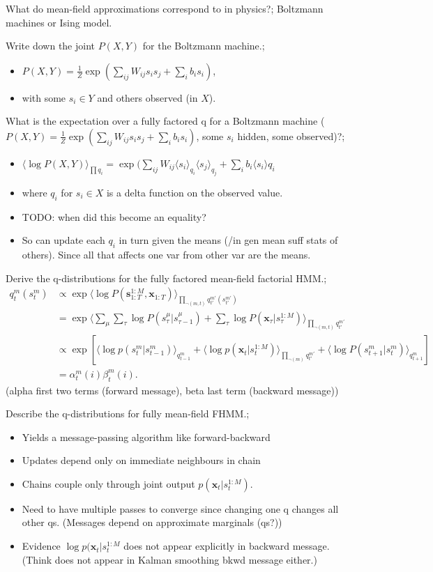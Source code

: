\documentclass{article}
\begin{document}
What do mean-field approximations correspond to in physics?; Boltzmann machines or Ising model.

Write down the joint $P(X,Y)$ for the Boltzmann machine.; \begin{itemize} \item $P(X,Y)=\frac{1}{Z}\exp(\sum_{ij}W_{ij}s_is_j+\sum_ib_is_i)$, \item with some $s_i\in Y$ and others observed (in $X$).  \end{itemize}

What is the expectation over a fully factored q for a Boltzmann machine ($P(X,Y)=\frac{1}{Z}\exp(\sum_{ij}W_{ij}s_is_j+\sum_ib_is_i)$, some $s_i$ hidden, some observed)?; \begin{itemize} \item $\langle \log P(X,Y)\rangle_{\prod q_i} =\exp(\sum_{ij}W_{ij}\langle s_i\rangle_{q_i}\langle s_j\rangle_{q_j}+\sum_ib_i\langle s_i\rangle q_i$ \item where $q_i$ for $s_i \in X$ is a delta function on the observed value.  \item TODO: when did this become an equality?  \item So can update each $q_i$ in turn given the means (/in gen mean suff stats of others). Since all that affects one var from other var are the means.  \end{itemize}

Derive the q-distributions for the fully factored mean-field factorial HMM.; \begin{align*} q^m_t(s^m_t) &\propto \exp \langle \log P(\bm{s}^{1:M}_{1:T}, \bm{x}_{1:T})\rangle_{\prod_{\neg (m, t)}q^{m'}_{t'}(s^{m'}_{t'})} \\ &= \exp \langle \sum_{\mu}\sum_\tau\log P(s^\mu_\tau|s^\mu_{\tau-1}) + \sum_\tau\log P(\bm{x}_\tau|s^{1:M}_\tau)\rangle_{\prod_{\neg (m, t)}q^{m'}_{t'}} \\ &\propto \exp [\langle \log p(s^m_t|s^m_{t-1})\rangle_{q^m_{t-1}} + \langle \log p(\bm{x}_t|s^{1:M}_t)\rangle_{\prod_{\neg(m)}q^{m'}_{t'}} + \langle \log P(s^m_{t+1}|s^m_t)\rangle_{q^m_{t+1}} ]\\ &= \alpha^m_t(i)\beta^m_t(i).  \end{align*} (alpha first two terms (forward message), beta last term (backward message))

Describe the q-distributions for fully mean-field FHMM.; \begin{itemize} \item Yields a message-passing algorithm like forward-backward \item Updates depend only on immediate neighbours in chain \item Chains couple only through joint output $p(\bm{x}_t|s^{1:M}_t)$.  \item Need to have multiple passes to converge since changing one q changes all other qs. (Messages depend on approximate marginals (qs?)) \item Evidence $\log p(\bm{x}_t|s_t^{1:M}$ does not appear explicitly in backward message. (Think does not appear in Kalman smoothing bkwd message either.) \end{itemize}
\end{document}
